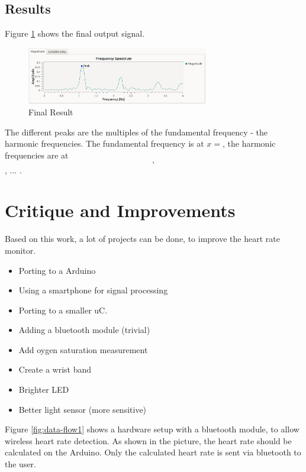 \documentclass[notitlepage]{scrreprt}
\begin{document}
\section{Results}
Figure \ref{fig:result} shows the final output signal.

\begin{figure}[H]
	\centering
	\includegraphics[width=300px]{images/withEverything.png}
	\caption{Final Result}
	\label{fig:result}
\end{figure}

The different peaks are the multiples of the fundamental frequency - the harmonic frequencies. The fundamental frequency is at $x = $, the harmonic frequencies are at $$, $$, ... . 

\chapter{Critique and Improvements}
Based on this work, a lot of projects can be done, to improve the heart rate monitor.

\begin{itemize}
	\item{Porting to a Arduino}
	\item{Using a smartphone for signal processing}
	\item{Porting to a smaller uC.}
	\item{Adding a bluetooth module (trivial)}
	\item{Add oygen saturation measurement}
	\item{Create a wrist band}
	\item{Brighter LED}
	\item{Better light sensor (more sensitive)}
\end{itemize}

Figure \ref{fig:data-flow1} shows a hardware setup with a bluetooth module, to allow wireless heart rate detection. As shown in the picture, the heart rate should be calculated on the Arduino. Only the calculated heart rate is sent via bluetooth to the user.
\end{document}
